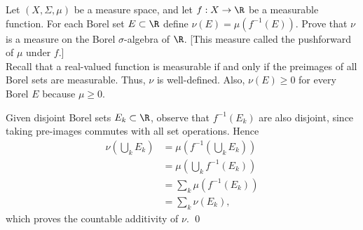 \begin{hwsol}
Let $(X,\Sigma,\mu)$ be a measure space, and let $f: X \to \R$ be a measurable function. For each Borel set $E \subset \R$ define $\nu(E)= \mu(f^{-1}(E))$. Prove that $\nu$ is a measure on the Borel $\sigma$-algebra of $\R$. [This measure called the pushforward of $\mu$ under $f$.] \\

\pf Recall that a real-valued function is measurable if and only if the preimages of all Borel sets are measurable. Thus, $\nu$ is well-defined. Also, $\nu(E) \geq 0$ for every Borel $E$ because $\mu \geq 0$. 

Given disjoint Borel sets $E_k \subset \R$, observe that $f^{-1}(E_k)$ are also disjoint, since taking pre-images commutes with all set operations. Hence  
        \[
        \begin{split}
        \nu \left( \bigcup_k E_k \right)&= \mu \left( f^{-1} \left( \bigcup_k E_k \right) \right) \\ 
        &= \mu \left( \bigcup_k f^{-1}(E_k) \right) \\ 
        &= \sum_k \mu \left( f^{-1}(E_k) \right) \\ 
        &= \sum_k \nu \left( E_k \right),
        \end{split}
        \]
which proves the countable additivity of $\nu$. \qed \\
\end{hwsol}
 

